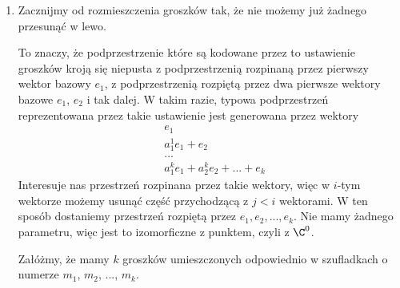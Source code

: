 \begin{enumerate}[label=\textbf{(\alph*)}]
  \item Zacznijmy od rozmieszczenia groszków tak, że nie możemy już żadnego przesunąć w lewo.
    \begin{center}\end{center}

    To znaczy, że podprzestrzenie które są kodowane przez to ustawienie groszków kroją się niepusta z podprzestrzenią rozpinaną przez pierwszy wektor bazowy $e_1$, z podprzestrzenią rozpiętą przez dwa pierwsze wektory bazowe $e_1$, $e_2$ i tak dalej. W takim razie, typowa podprzestrzeń reprezentowana przez takie ustawienie jest generowana przez wektory
    \begin{align*}
      &e_1\\ 
      &a_1^1e_1+e_2\\ 
      &...\\ 
      &a_1^ke_1+a_2^ke_2+...+e_k
    \end{align*}
    Interesuje nas przestrzeń rozpinana przez takie wektory, więc w $i$-tym wektorze możemy usunąć część przychodzącą z $j<i$ wektorami. W ten sposób dostaniemy przestrzeń rozpiętą przez $e_1, e_2, ...,e_k$. Nie mamy żadnego parametru, więc jest to izomorficzne z punktem, czyli z $\C^0$.

    Załóżmy, że mamy $k$ groszków umieszczonych odpowiednio w szufladkach o numerze $m_1$, $m_2$, ..., $m_k$. 
    \begin{center}
\end{center}
\end{enumerate}

